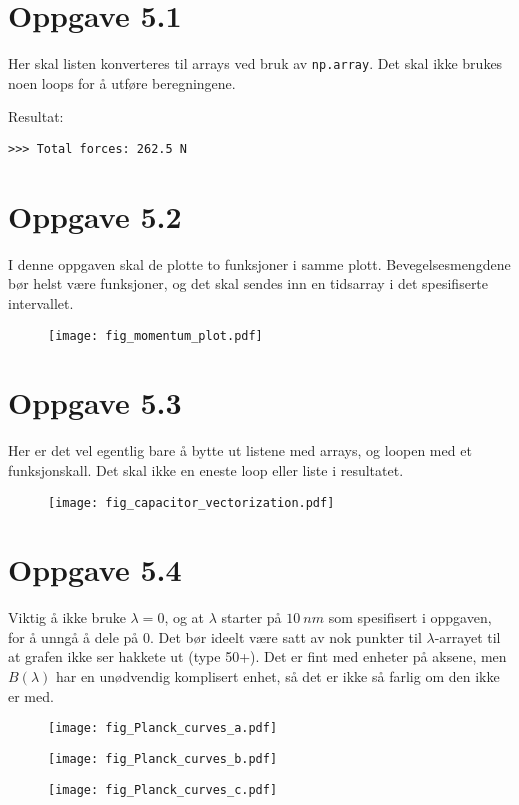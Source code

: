\documentclass[10pt,a4paper]{article}
\begin{document}
\section*{Oppgave 5.1}
Her skal listen konverteres til arrays ved bruk av \texttt{np.array}. Det skal ikke brukes noen loops for å utføre beregningene.

Resultat:
\begin{verbatim}
>>> Total forces: 262.5 N
\end{verbatim}
\newpage
\section*{Oppgave 5.2}
I denne oppgaven skal de plotte to funksjoner i samme plott. Bevegelsesmengdene bør helst være funksjoner, og det skal sendes inn en tidsarray i det spesifiserte intervallet.


\begin{figure}[H]
\centering
\texttt{[image: fig\_momentum\_plot.pdf]}
\end{figure}



\newpage
\section*{Oppgave 5.3}
Her er det vel egentlig bare å bytte ut listene med arrays, og loopen med et funksjonskall. Det skal ikke en eneste loop eller liste i resultatet.


\begin{figure}[H]
\centering
\texttt{[image: fig\_capacitor\_vectorization.pdf]}
\end{figure}



\newpage
\section*{Oppgave 5.4}
Viktig å ikke bruke $\lambda = 0$, og at $\lambda$ starter på $\SI{10}{nm}$ som spesifisert i oppgaven, for å unngå å dele på 0. Det bør ideelt være satt av nok punkter til $\lambda$-arrayet til at grafen ikke ser hakkete ut (type 50+). Det er fint med enheter på aksene, men $B(\lambda)$ har en unødvendig komplisert enhet, så det er ikke så farlig om den ikke er med.


\begin{figure}[H]
\centering
\texttt{[image: fig\_Planck\_curves\_a.pdf]}
\end{figure}
\begin{figure}[H]
\centering
\texttt{[image: fig\_Planck\_curves\_b.pdf]}
\end{figure}
\begin{figure}[H]
\centering
\texttt{[image: fig\_Planck\_curves\_c.pdf]}
\end{figure}
\end{document}
